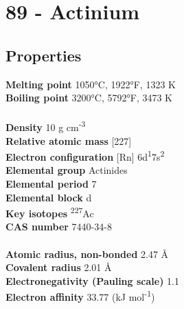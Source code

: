 \section{89 - Actinium}
\label{sec:elem-actinium}
\subsection{Properties}
\textbf{Melting point} 1050°C, 1922°F, 1323 K\\
\textbf{Boiling point} 3200°C, 5792°F, 3473 K\\
\\
\textbf{Density} 10 g cm\textsuperscript{-3}\\
\textbf{Relative atomic mass} [227]\\
\textbf{Electron configuration} [Rn] 6d\textsuperscript{1}7s\textsuperscript{2}\\
\textbf{Elemental group} Actinides\\
\textbf{Elemental period} 7\\
\textbf{Elemental block} d\\
\textbf{Key isotopes} \textsuperscript{227}Ac\\
\textbf{CAS number} 7440-34-8\\
\\
\textbf{Atomic radius, non-bonded} 2.47 Å\\
\textbf{Covalent radius} 2.01 Å\\
\textbf{Electronegativity (Pauling scale)} 1.1\\
\textbf{Electron affinity} 33.77 (kJ mol\textsuperscript{-1})\\